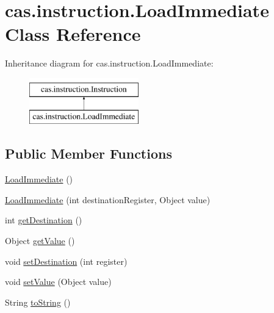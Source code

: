 \hypertarget{classcas_1_1instruction_1_1_load_immediate}{\section{cas.\-instruction.\-Load\-Immediate Class Reference}
\label{classcas_1_1instruction_1_1_load_immediate}
}
Inheritance diagram for cas.\-instruction.\-Load\-Immediate\-:\begin{figure}[H]
\begin{center}
\leavevmode
\includegraphics[height=2.000000cm]{classcas_1_1instruction_1_1_load_immediate}
\end{center}
\end{figure}
\subsection*{Public Member Functions}
\begin{DoxyCompactItemize}
\item 
\hyperlink{classcas_1_1instruction_1_1_load_immediate_ae02e96bf1e903b64f8922bbb56f662e6}{Load\-Immediate} ()
\item 
\hyperlink{classcas_1_1instruction_1_1_load_immediate_ae46e3993eba5fb51f6786a7795ec59eb}{Load\-Immediate} (int destination\-Register, Object value)
\item 
int \hyperlink{classcas_1_1instruction_1_1_load_immediate_a8668d8c66547e77dc78f78d70ef59904}{get\-Destination} ()
\item 
Object \hyperlink{classcas_1_1instruction_1_1_load_immediate_ae4ad3cb6692135efa2bcf3e53dc004c1}{get\-Value} ()
\item 
void \hyperlink{classcas_1_1instruction_1_1_load_immediate_a3049950382f8cc92298b5d0233347676}{set\-Destination} (int register)
\item 
void \hyperlink{classcas_1_1instruction_1_1_load_immediate_a42b8b2a8a2f37e715f8cadcd2c8b38b6}{set\-Value} (Object value)
\item 
String \hyperlink{classcas_1_1instruction_1_1_load_immediate_a92ecadc8a40421b3fffd9ee0bb3e3cfd}{to\-String} ()
\end{DoxyCompactItemize}


